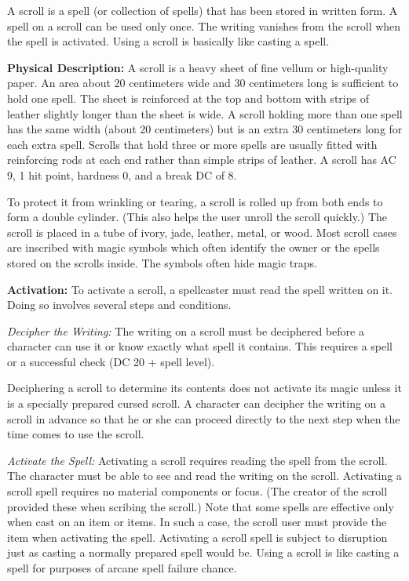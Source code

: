 A scroll is a spell (or collection of spells) that has been stored in written form. A spell on a scroll can be used only once. The writing vanishes from the scroll when the spell is activated. Using a scroll is basically like casting a spell.

\textbf{Physical Description:} A scroll is a heavy sheet of fine vellum or high-quality paper. An area about 20 centimeters wide and 30 centimeters long is sufficient to hold one spell. The sheet is reinforced at the top and bottom with strips of leather slightly longer than the sheet is wide. A scroll holding more than one spell has the same width (about 20 centimeters) but is an extra 30 centimeters long for each extra spell. Scrolls that hold three or more spells are usually fitted with reinforcing rods at each end rather than simple strips of leather. A scroll has AC 9, 1 hit point, hardness 0, and a break DC of 8.

To protect it from wrinkling or tearing, a scroll is rolled up from both ends to form a double cylinder. (This also helps the user unroll the scroll quickly.) The scroll is placed in a tube of ivory, jade, leather, metal, or wood. Most scroll cases are inscribed with magic symbols which often identify the owner or the spells stored on the scrolls inside. The symbols often hide magic traps.

\textbf{Activation:} To activate a scroll, a spellcaster must read the spell written on it. Doing so involves several steps and conditions.

\textit{Decipher the Writing:} The writing on a scroll must be deciphered before a character can use it or know exactly what spell it contains. This requires a  spell or a successful  check (DC 20 + spell level).

Deciphering a scroll to determine its contents does not activate its magic unless it is a specially prepared cursed scroll. A character can decipher the writing on a scroll in advance so that he or she can proceed directly to the next step when the time comes to use the scroll.

\textit{Activate the Spell:} Activating a scroll requires reading the spell from the scroll. The character must be able to see and read the writing on the scroll. Activating a scroll spell requires no material components or focus. (The creator of the scroll provided these when scribing the scroll.) Note that some spells are effective only when cast on an item or items. In such a case, the scroll user must provide the item when activating the spell. Activating a scroll spell is subject to disruption just as casting a normally prepared spell would be. Using a scroll is like casting a spell for purposes of arcane spell failure chance.

